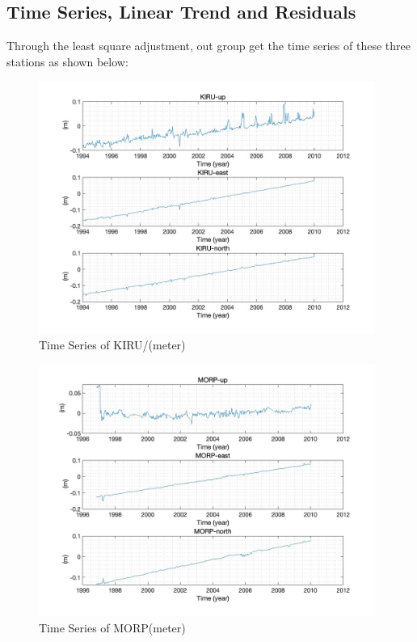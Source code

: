 \documentclass{article}
\begin{document}
\subsection{Time Series, Linear Trend and Residuals}
Through the least square adjustment, out group get the time series of these three stations as shown below:
\begin{figure}[htbp]
  \centering
  \includegraphics[width=11cm]{../result/re_figure/fig_kiru/5.jpg}
  \captionsetup{skip=0.2cm}
  \caption{Time Series of KIRU/(meter)}
  \label{fig:Ori_KIRU}
\end{figure}
\begin{figure}[htbp]
  \centering
  \includegraphics[width=11cm]{../result/re_figure/fig_MORP/5.jpg}
  \caption{Time Series of MORP(meter)}
  \label{fig:Ori_MORP}
\end{figure}
\end{document}
